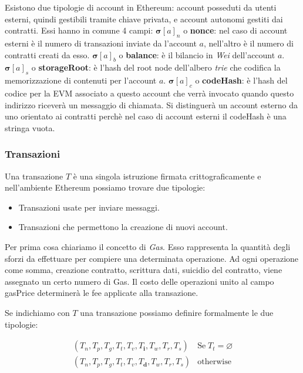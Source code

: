 	Esistono due tipologie di account in Ethereum: account posseduti da utenti esterni, quindi gestibili tramite chiave privata, e account autonomi gestiti dai contratti. Essi hanno in comune 4 campi:
	$\boldsymbol{\sigma}[a]_n$ o \textbf{nonce}: nel caso di account esterni è il numero di transazioni inviate da l'account $a$, nell'altro è il numero di contratti creati da esso.
	$\boldsymbol{\sigma}[a]_b$ o \textbf{balance}: è il bilancio in \textit{Wei} dell'account $a$.
	$\boldsymbol{\sigma}[a]_s$ o \textbf{storageRoot}: è l'hash del root node dell'albero \textit{trie} che codifica la memorizzazione di contenuti per l'account $a$.
	$\boldsymbol{\sigma}[a]_c$ o \textbf{codeHash}: è l'hash del codice per la EVM associato a questo account che verrà invocato quando questo indirizzo riceverà un messaggio di chiamata. Si distinguerà un account esterno da uno orientato ai contratti perchè nel caso di account esterni il codeHash è una stringa vuota.
	
	\subsubsection{Transazioni}
	
	Una transazione $T$ è una singola istruzione firmata crittograficamente e nell'ambiente Ethereum possiamo trovare due tipologie:
	\begin{itemize}
		\item Transazioni usate per inviare messaggi.
		\item Transazioni che permettono la creazione di nuovi account.
	\end{itemize}
	
	Per prima cosa chiariamo il concetto di \textit{Gas}.
	Esso rappresenta la quantità degli sforzi da effettuare per compiere una determinata operazione. Ad ogni operazione come somma, creazione contratto, scrittura dati, suicidio del contratto, viene assegnato un certo numero di Gas. 
	Il costo delle operazioni unito al campo gasPrice determinerà le fee applicate alla transazione.
	
	Se indichiamo con $T$ una transazione possiamo definire formalmente le due tipologie:
	
	\begin{eqnarray}
	(T_n, T_p, T_g, T_t, T_v, T_\mathbf{i}, T_w, T_r, T_s) & \text{Se} \; T_t = \varnothing\\
	(T_n, T_p, T_g, T_t, T_v, T_\mathbf{d}, T_w, T_r, T_s) & \text{otherwise}
	\end{eqnarray}
	
